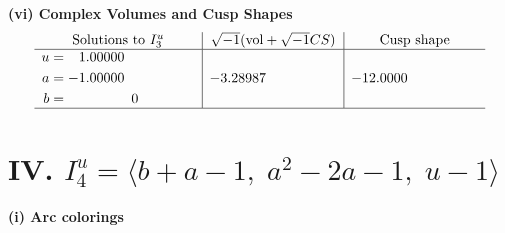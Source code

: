 \documentclass[1p]{elsarticle_modified}
\theoremstyle{definition}
\newcommand{\I}{\sqrt{-1}}
\begin{document}
\newpage\flushleft \textbf{(vi) Complex Volumes and Cusp Shapes}
$$\begin{array}{c|c|c}  
\text{Solutions to }I^u_{3}& \I (\text{vol} + \sqrt{-1}CS) & \text{Cusp shape}\\
 \hline 
\begin{aligned}
u &= \phantom{-}1.00000\phantom{ +0.000000I} \\
a &= -1.00000\phantom{ +0.000000I} \\
b &= \phantom{-0.000000 } 0\end{aligned}
 & -3.28987\phantom{ +0.000000I} & -12.0000\phantom{ +0.000000I}\\
 \hline 
 \end{array}$$\newpage\newpage\renewcommand{\arraystretch}{1}
\centering \section*{IV. $I^u_{4}= \langle b+a-1,\;a^2-2 a-1,\;u-1 \rangle$}
\flushleft \textbf{(i) Arc colorings}\\
\end{document}
